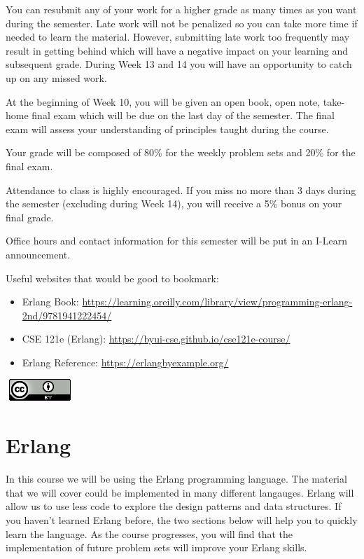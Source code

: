 \documentclass[
]{book}
\begin{document}
You can resubmit any of your work for a higher grade as many times as you want during the semester. Late work will not be penalized so you can take more time if needed to learn the material. However, submitting late work too frequently may result in getting behind which will have a negative impact on your learning and subsequent grade. During Week 13 and 14 you will have an opportunity to catch up on any missed work.

At the beginning of Week 10, you will be given an open book, open note, take-home final exam which will be due on the last day of the semester. The final exam will assess your understanding of principles taught during the course.

Your grade will be composed of 80\% for the weekly problem sets and 20\% for the final exam.

Attendance to class is highly encouraged. If you miss no more than 3 days during the semester (excluding during Week 14), you will receive a 5\% bonus on your final grade.

Office hours and contact information for this semester will be put in an I-Learn announcement.

Useful websites that would be good to bookmark:

\begin{itemize}
\item
  Erlang Book: \url{https://learning.oreilly.com/library/view/programming-erlang-2nd/9781941222454/}
\item
  CSE 121e (Erlang): \url{https://byui-cse.github.io/cse121e-course/}
\item
  Erlang Reference: \url{https://erlangbyexample.org/}
\end{itemize}

\(\nonumber\)
\href{http://creativecommons.org/licenses/by/4.0/}{\includegraphics{images/cc-88x31.png}}

\hypertarget{erlang}{%
\chapter{Erlang}\label{erlang}}

In this course we will be using the Erlang programming language. The material that we will cover could be implemented in many different langauges. Erlang will allow us to use less code to explore the design patterns and data structures. If you haven't learned Erlang before, the two sections below will help you to quickly learn the language. As the course progresses, you will find that the implementation of future problem sets will improve your Erlang skills.
\end{document}
